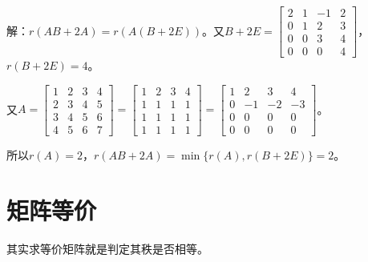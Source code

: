 \documentclass[UTF8, 12pt]{ctexart}
\begin{document}
解：$r(AB+2A)=r(A(B+2E))$。又$B+2E=\left[\begin{array}{cccc}
    2 & 1 & -1 & 2 \\
    0 & 1 & 2 & 3 \\
    0 & 0 & 3 & 4 \\
    0 & 0 & 0 & 4
\end{array}\right]$，$r(B+2E)=4$。

又$A=\left[\begin{array}{cccc}
    1 & 2 & 3 & 4 \\
    2 & 3 & 4 & 5 \\
    3 & 4 & 5 & 6 \\
    4 & 5 & 6 & 7
\end{array}\right]=\left[\begin{array}{cccc}
    1 & 2 & 3 & 4 \\
    1 & 1 & 1 & 1 \\
    1 & 1 & 1 & 1 \\
    1 & 1 & 1 & 1
\end{array}\right]=\left[\begin{array}{cccc}
    1 & 2 & 3 & 4 \\
    0 & -1 & -2 & -3 \\
    0 & 0 & 0 & 0 \\
    0 & 0 & 0 & 0
\end{array}\right]$。\medskip

所以$r(A)=2$，$r(AB+2A)=\min\{r(A),r(B+2E)\}=2$。

\section{矩阵等价}

其实求等价矩阵就是判定其秩是否相等。
\end{document}
